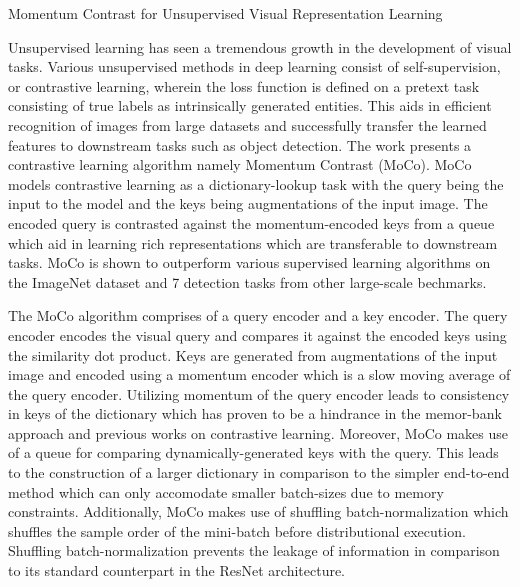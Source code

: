 \documentclass[11pt,letterpaper]{article}
\begin{document}
\begin{center}
  \large{Momentum Contrast for Unsupervised Visual Representation Learning}
\end{center}

Unsupervised learning has seen a tremendous growth in the development of visual tasks. Various unsupervised methods in deep learning consist of self-supervision, or contrastive learning, wherein the loss function is defined on a pretext task consisting of true labels as intrinsically generated entities. This aids in efficient recognition of images from large datasets and successfully transfer the learned features to downstream tasks such as object detection. The work presents a contrastive learning algorithm namely Momentum Contrast (MoCo). MoCo models contrastive learning as a dictionary-lookup task with the query being the input to the model and the keys being augmentations of the input image. The encoded query is contrasted against the momentum-encoded keys from a queue which aid in learning rich representations which are transferable to downstream tasks. MoCo is shown to outperform various supervised learning algorithms on the ImageNet dataset and 7 detection tasks from other large-scale bechmarks.

The MoCo algorithm comprises of a query encoder and a key encoder. The query encoder encodes the visual query and compares it against the encoded keys using the similarity dot product. Keys are generated from augmentations of the input image and encoded using a momentum encoder which is a slow moving average of the query encoder. Utilizing momentum of the query encoder leads to consistency in keys of the dictionary which has proven to be a hindrance in the memor-bank approach and previous works on contrastive learning. Moreover, MoCo makes use of a queue for comparing dynamically-generated keys with the query. This leads to the construction of a larger dictionary in comparison to the simpler end-to-end method which can only accomodate smaller batch-sizes due to memory constraints. Additionally, MoCo makes use of shuffling batch-normalization which shuffles the sample order of the mini-batch before distributional execution. Shuffling batch-normalization prevents the leakage of information in comparison to its standard counterpart in the ResNet architecture.  
\end{document}
